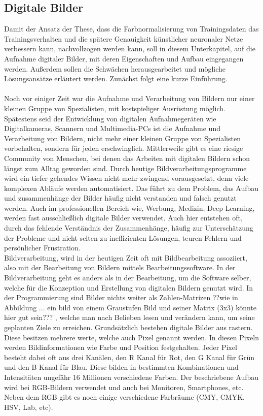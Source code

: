 \documentclass[a4paper,12pt,oneside]{article}
\begin{document}
  \subsection{Digitale Bilder}\label{s.digibilder}
  Damit der Ansatz der These, dass die Farbnormalisierung von Trainingsdaten das Trainingsverhalten und die spätere Genauigkeit künstlicher neuronaler Netze verbessern kann, nachvollzogen werden kann, soll in diesem Unterkapitel, auf die Aufnahme digitaler Bilder, mit deren Eigenschaften und Aufbau eingegangen werden. Außerdem sollen die Schwächen herausgearbeitet und mögliche Lösungsansätze erläutert werden. Zunächst folgt eine kurze Einführung.\\\\
  Noch vor einiger Zeit war die Aufnahme und Verarbeitung von Bildern nur einer kleinen Gruppe von Spezialisten, mit kostspieliger Ausrüstung möglich. Spätestens seid der Entwicklung von digitalen Aufnahmegeräten wie Digitalkameras, Scannern und Multimedia-PCs ist die Aufnahme und Verarbeitung von Bildern, nicht mehr einer kleinen Gruppe von Spezialisten vorbehalten, sondern für jeden erschwinglich. Mittlerweile gibt es eine riesige Community von Menschen, bei denen das Arbeiten mit digitalen Bildern schon längst zum Alltag geworden sind. Durch heutige Bildverarbeitungsprogramme wird ein tiefer gehendes Wissen nicht mehr zwingend vorausgesetzt, denn viele komplexen Abläufe werden automatisiert. Das führt zu dem Problem, das Aufbau und zusammenhänge der Bilder häufig nicht verstanden und falsch genutzt werden. Auch im professionellen Bereich wie, Werbung, Medizin, Deep Learning, werden fast ausschließlich digitale Bilder verwendet. Auch hier entstehen oft, durch das fehlende Verständnis der Zusammenhänge, häufig zur Unterschätzung der Probleme und nicht selten zu ineffizienten Lösungen, teuren Fehlern und persönlicher Frustration.\\
  Bildverarbeitung, wird in der heutigen Zeit oft mit Bildbearbeitung assoziiert, also mit der Bearbeitung von Bildern mittels Bearbeitungssoftware. In der Bildverarbeitung geht es anders als in der Bearbeitung, um die Software selber, welche für die Konzeption und Erstellung von digitalen Bildern genutzt wird. In der Programmierung sind Bilder nichts weiter als Zahlen-Matrizen ??wie in Abbildung ... ein bild von einem Graustufen Bild und seiner Matrix (3x3)  könnte hier gut sein??? , welche man nach Belieben lesen und verändern kann, um seine geplanten Ziele zu erreichen. Grundsätzlich bestehen digitale Bilder aus rastern. Diese besitzen mehrere werte, welche auch Pixel genannt werden. In diesen Pixeln werden Bildinformationen wie Farbe und Position festgehalten. Jeder Pixel besteht dabei oft aus drei Kanälen, den R Kanal für Rot, den G Kanal für Grün und den B Kanal für Blau. Diese bilden in bestimmten Kombinationen und Intensitäten ungefähr 16 Millionen verschiedene Farben. Der beschriebene Aufbau wird bei RGB-Bildern verwendet und auch bei Monitoren, Smartphones, etc. Neben dem RGB gibt es noch einige verschiedene Farbräume (CMY, CMYK, HSV, Lab, etc).\\\\
\end{document}
